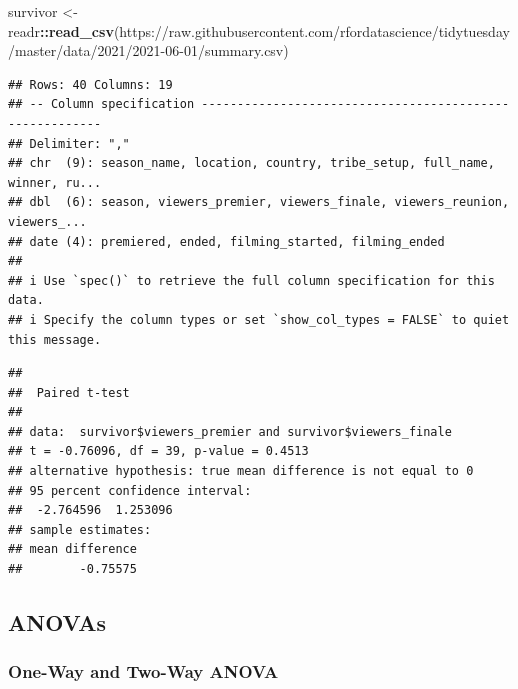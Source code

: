 \documentclass[
  b5paper]{book}
\newenvironment{Shaded}{\begin{snugshade}}{\end{snugshade}}
\newcommand{\AttributeTok}[1]{\textcolor[rgb]{0.13,0.29,0.53}{#1}}
\newcommand{\CommentTok}[1]{\textcolor[rgb]{0.56,0.35,0.01}{\textit{#1}}}
\newcommand{\ConstantTok}[1]{\textcolor[rgb]{0.56,0.35,0.01}{#1}}
\newcommand{\FunctionTok}[1]{\textcolor[rgb]{0.13,0.29,0.53}{\textbf{#1}}}
\newcommand{\NormalTok}[1]{#1}
\newcommand{\OtherTok}[1]{\textcolor[rgb]{0.56,0.35,0.01}{#1}}
\newcommand{\SpecialCharTok}[1]{\textcolor[rgb]{0.81,0.36,0.00}{\textbf{#1}}}
\newcommand{\StringTok}[1]{\textcolor[rgb]{0.31,0.60,0.02}{#1}}
\begin{document}
\begin{Shaded}
\begin{Highlighting}[]
\NormalTok{survivor }\OtherTok{\textless{}{-}}\NormalTok{ readr}\SpecialCharTok{::}\FunctionTok{read\_csv}\NormalTok{(}\StringTok{\textquotesingle{}https://raw.githubusercontent.com/rfordatascience/tidytuesday/master/data/2021/2021{-}06{-}01/summary.csv\textquotesingle{}}\NormalTok{)}
\end{Highlighting}
\end{Shaded}

\begin{verbatim}
## Rows: 40 Columns: 19
## -- Column specification --------------------------------------------------------
## Delimiter: ","
## chr  (9): season_name, location, country, tribe_setup, full_name, winner, ru...
## dbl  (6): season, viewers_premier, viewers_finale, viewers_reunion, viewers_...
## date (4): premiered, ended, filming_started, filming_ended
## 
## i Use `spec()` to retrieve the full column specification for this data.
## i Specify the column types or set `show_col_types = FALSE` to quiet this message.
\end{verbatim}

\begin{Shaded}
\end{Shaded}

\begin{verbatim}
## 
##  Paired t-test
## 
## data:  survivor$viewers_premier and survivor$viewers_finale
## t = -0.76096, df = 39, p-value = 0.4513
## alternative hypothesis: true mean difference is not equal to 0
## 95 percent confidence interval:
##  -2.764596  1.253096
## sample estimates:
## mean difference 
##        -0.75575
\end{verbatim}

\hypertarget{anovas}{%
\subsection{ANOVAs}\label{anovas}}

\hypertarget{one-way-and-two-way-anova}{%
\subsubsection{One-Way and Two-Way ANOVA}\label{one-way-and-two-way-anova}}
\end{document}
